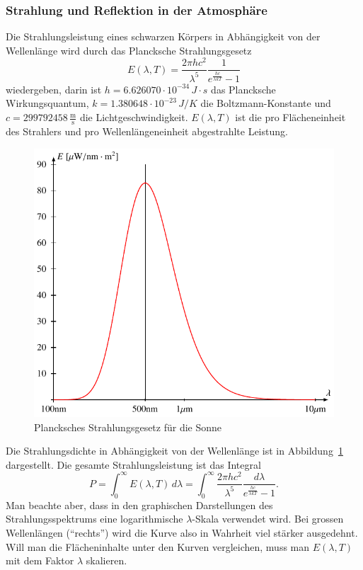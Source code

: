 \subsubsection{Strahlung und Reflektion in der Atmosphäre}
Die Strahlungsleistung eines schwarzen Körpers in Abhängigkeit
von der Wellenlänge wird durch das Plancksche Strahlungsgesetz
\begin{equation}
E(\lambda,T)
=
\frac{2\pi hc^2}{\lambda^5}\frac{1}{e^{\frac{hc}{\lambda kT}}-1}
\end{equation}
wiedergeben, darin ist 
$h=6.626070\cdot 10^{-34}\,J\cdot s$ das Plancksche Wirkungsquantum,
$k=1.380648\cdot10^{-23}\,J/K$ die Boltzmann-Konstante
und
$c=299792458\,\frac{\text{m}}{\text{s}}$ die Lichtgeschwindigkeit.
$E(\lambda,T)$ ist die
pro Flächeneinheit des Strahlers und pro Wellenlängeneinheit
abgestrahlte Leistung.
\begin{figure}
\centering
\includegraphics{chapters/1/planck.pdf}
\caption{Plancksches Strahlungsgesetz für die Sonne
\label{skript:planck-kurve}}
\end{figure}
Die Strahlungsdichte in Abhängigkeit von der Wellenlänge ist in
Abbildung~\ref{skript:planck-kurve} dargestellt.
Die gesamte Strahlungsleistung ist das Integral
\[
P
=
\int_{0}^\infty E(\lambda,T)\,d\lambda
=
\int_{0}^\infty 
\frac{2\pi hc^2}{\lambda^5}\frac{d\lambda}{e^{\frac{hc}{\lambda kT}}-1}.
\]
Man beachte aber, dass in den graphischen Darstellungen des
Strahlungsspektrums eine logarithmische $\lambda$-Skala
verwendet wird.
Bei grossen Wellenlängen (``rechts'') wird die Kurve also in Wahrheit
viel stärker ausgedehnt.
Will man die Flächeninhalte unter den Kurven vergleichen, muss man
$E(\lambda,T)$ mit dem Faktor $\lambda$ skalieren.

